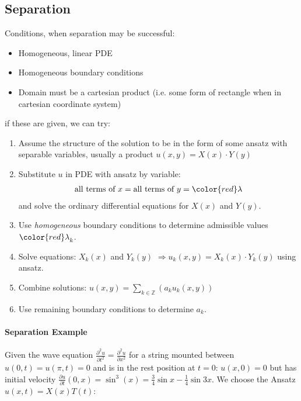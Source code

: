 \subsection{Separation}\label{subsec:separation}

Conditions, when separation may be successful:

\begin{itemize}
    \item Homogeneous, linear PDE
    \item Homogeneous boundary conditions
    \item Domain must be a cartesian product (i.e. some form of rectangle when in cartesian coordinate system)
\end{itemize}

if these are given, we can try:

\begin{enumerate}
    \item Assume the structure of the solution to be in the form of some ansatz with separable variables, usually a product $u(x,y)=X(x)\cdot Y(y)$
    \item{
        Substitute $u$ in PDE with ansatz by variable:
        \begin{align*}
            \text{all terms of }x = \text{all terms of }y = {\color{red}\lambda}
        \end{align*}
        and solve the ordinary differential equations for $X(x)$ and $Y(y)$.
    }
    \item Use \emph{homogeneous} boundary conditions to determine admissible values ${\color{red}\lambda}_k$.
    \item Solve equations: $X_k(x)$ and $Y_k(y)$ $\Rightarrow u_k(x,y)=X_k(x)\cdot Y_k(y)$ using ansatz.
    \item Combine solutions: $u(x,y)=\sum_{k\in \mathbb{Z}}\left(a_ku_k(x,y)\right)$
    \item Use remaining boundary conditions to determine $a_k$.
\end{enumerate}

\paragraph{Separation Example}

Given the wave equation $\frac{\partial^2u}{\partial t^2}=\frac{\partial^2 u}{\partial x^2}$
for a string mounted between $u(0,t)=u(\pi,t)=0$ and is in the rest position at $t=0$: $u(x,0)=0$ but has initial velocity
$\frac{\partial u}{\partial t}(0,x)=\sin^3(x)=\frac{3}{4}\sin x-\frac{1}{4}\sin 3x$.
We choose the Ansatz $u(x,t)=X(x)T(t)$:

